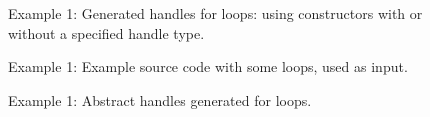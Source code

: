 \begin{figure}[!h]
{\indent
{\mySmallestFontSize
\begin{latexonly}
  
\end{latexonly}

\begin{htmlonly}
   
\end{htmlonly}

}
}
\caption{Example 1: Generated handles for loops: using constructors with or without a specified handle type.}
\label{Tutorial:abstractHandle1}
\end{figure}
\begin{figure}[!h]
{\indent
{\mySmallestFontSize
\begin{latexonly}
  
\end{latexonly}

\begin{htmlonly}
   
\end{htmlonly}

}
}
\caption{Example 1: Example source code with some loops, used as input.}
\label{Tutorial:abstractHandle1input}
\end{figure}


\begin{figure}[!h]
{\indent
{\mySmallestFontSize
\begin{latexonly}
  
\end{latexonly}

\begin{htmlonly}
   
\end{htmlonly}

}
}
\caption{Example 1: Abstract handles generated for loops.}
\label{Tutorial:abstractHandle1out}
\end{figure}

